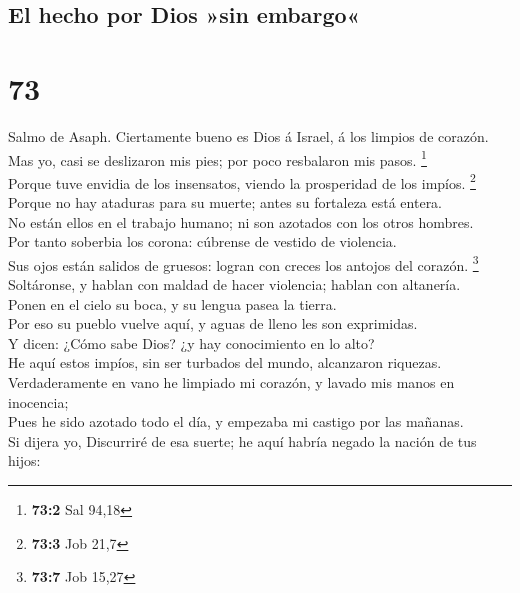 \hypertarget{el-hecho-por-dios-sin-embargo}{%
\subsection{El hecho por Dios »sin
embargo«}\label{el-hecho-por-dios-sin-embargo}}

\hypertarget{section-72}{%
\section{73}\label{section-72}}

 Salmo de Asaph. Ciertamente bueno es Dios á Israel, á los
limpios de corazón.\\
 Mas yo, casi se deslizaron mis pies; por poco resbalaron
mis pasos. \footnote{\textbf{73:2} Sal 94,18}\\
 Porque tuve envidia de los insensatos, viendo la
prosperidad de los impíos. \footnote{\textbf{73:3} Job 21,7}\\
 Porque no hay ataduras para su muerte; antes su fortaleza
está entera.\\
 No están ellos en el trabajo humano; ni son azotados con
los otros hombres.\\
 Por tanto soberbia los corona: cúbrense de vestido de
violencia.\\
 Sus ojos están salidos de gruesos: logran con creces los
antojos del corazón. \footnote{\textbf{73:7} Job 15,27}\\
 Soltáronse, y hablan con maldad de hacer violencia; hablan
con altanería.\\
 Ponen en el cielo su boca, y su lengua pasea la tierra.\\
 Por eso su pueblo vuelve aquí, y aguas de lleno les son
exprimidas.\\
 Y dicen: ¿Cómo sabe Dios? ¿y hay conocimiento en lo
alto?\\
 He aquí estos impíos, sin ser turbados del mundo,
alcanzaron riquezas.\\
 Verdaderamente en vano he limpiado mi corazón, y lavado
mis manos en inocencia;\\
 Pues he sido azotado todo el día, y empezaba mi castigo
por las mañanas.\\
 Si dijera yo, Discurriré de esa suerte; he aquí habría
negado la nación de tus hijos:\\
